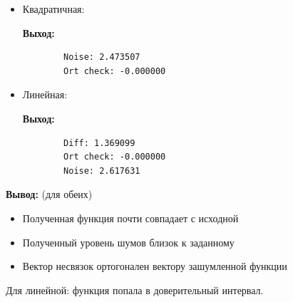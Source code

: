 \documentclass{article}
\begin{document}
	\begin{itemize}
		\item Квадратичная:
		
		
		{\bf Выход:}\\
		\begin{lstlisting}
		Noise: 2.473507
		Ort check: -0.000000\end{lstlisting}
		
		
	
		\item Линейная:
		
		
		{\bf Выход:}\\
		\begin{lstlisting}
		Diff: 1.369099
		Ort check: -0.000000
		Noise: 2.617631\end{lstlisting}
		
	\end{itemize}
	
	\textbf{Вывод:} (для обеих)
	\begin{itemize}
		\item Полученная функция почти совпадает с исходной
		\item Полученный уровень шумов близок к заданному
		\item Вектор несвязок ортогонален вектору зашумленной функции
	\end{itemize}
	Для линейной: функция попала в доверительный интервал.
	
\end{document}
